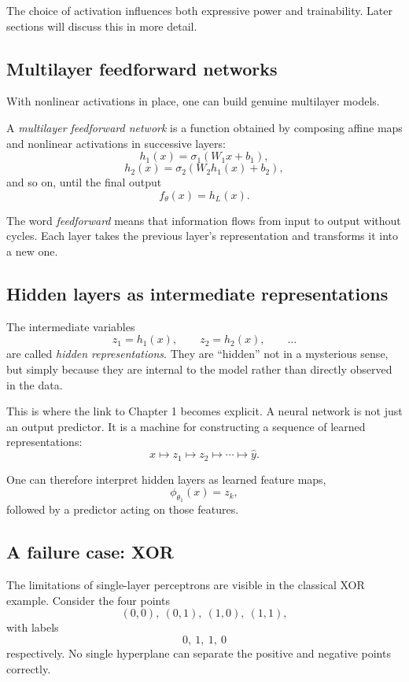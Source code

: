 The choice of activation influences both expressive power and trainability. Later sections will discuss this in more detail.

\subsection*{Multilayer feedforward networks}

With nonlinear activations in place, one can build genuine multilayer models.

\begin{definition}
A \emph{multilayer feedforward network} is a function obtained by composing affine maps and nonlinear activations in successive layers:
\[
h_1(x)=\sigma_1(W_1x+b_1),
\]
\[
h_2(x)=\sigma_2(W_2h_1(x)+b_2),
\]
and so on, until the final output
\[
f_\theta(x)=h_L(x).
\]
\end{definition}

The word \emph{feedforward} means that information flows from input to output without cycles. Each layer takes the previous layer's representation and transforms it into a new one.

\subsection*{Hidden layers as intermediate representations}

The intermediate variables
\[
z_1=h_1(x),\qquad z_2=h_2(x),\qquad \dots
\]
are called \emph{hidden representations}. They are “hidden” not in a mysterious sense, but simply because they are internal to the model rather than directly observed in the data.

This is where the link to Chapter 1 becomes explicit. A neural network is not just an output predictor. It is a machine for constructing a sequence of learned representations:
\[
x \mapsto z_1 \mapsto z_2 \mapsto \cdots \mapsto \hat y.
\]

One can therefore interpret hidden layers as learned feature maps,
\[
\phi_{\theta_1}(x)=z_k,
\]
followed by a predictor acting on those features.

\subsection*{A failure case: XOR}

The limitations of single-layer perceptrons are visible in the classical XOR example. Consider the four points
\[
(0,0),\ (0,1),\ (1,0),\ (1,1),
\]
with labels
\[
0,\ 1,\ 1,\ 0
\]
respectively. No single hyperplane can separate the positive and negative points correctly.

